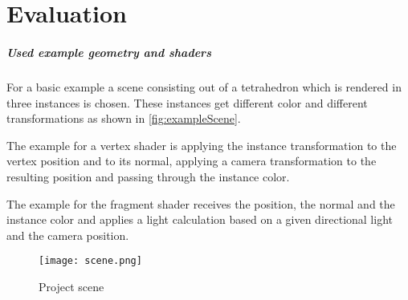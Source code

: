
\chapter{Evaluation}\label{cha:Evaluation}

\paragraph{Used example geometry and shaders}

For a basic example a scene consisting out of a tetrahedron which is rendered in three instances is chosen. These instances get different color and different transformations as shown in  \autoref{fig:exampleScene}.

The example for a vertex shader is applying the instance transformation to the vertex position and to its normal, applying a camera transformation to the resulting position and passing through the instance color.

The example for the fragment shader receives the position, the normal and the instance color and applies a light calculation based on a given directional light and the camera position.

\begin{figure}[h!]
  \centering 
  \texttt{[image: scene.png]}
  \caption[Screenshot of example scene of the project]{Project scene}
  \label{fig:exampleScene}
\end{figure}